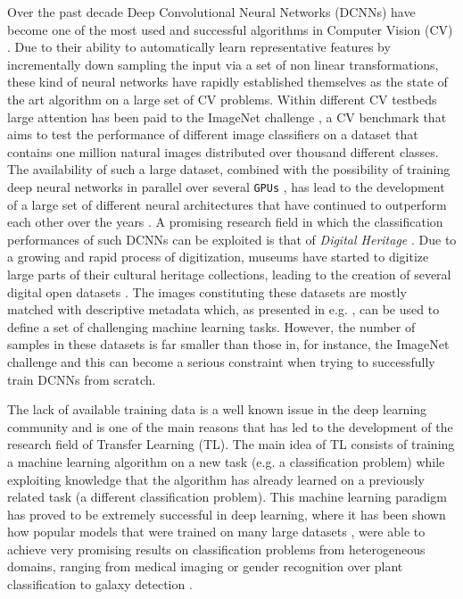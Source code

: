 Over the past decade Deep Convolutional Neural Networks (DCNNs) have become one of the most used and successful algorithms in Computer Vision (CV) \cite{donahue2014decaf, ma2015multimodal,tome2016deep}. Due to their ability to automatically learn representative features by incrementally down sampling the input via a set of non linear transformations, these kind of neural networks have rapidly established themselves as the state of the art algorithm on a large set of CV problems. Within different CV testbeds large attention has been paid to the ImageNet challenge \cite{deng2009imagenet}, a CV benchmark that aims to test the performance of different image classifiers on a dataset that contains one million natural images distributed over thousand different classes. The availability of such a large dataset, combined with the possibility of training deep neural networks in parallel over several \texttt{GPUs} \cite{krizhevsky2012imagenet}, has lead to the development of a large set of different neural architectures that have continued to outperform each other over the years \cite{simonyan2014very,szegedy2016rethinking,chollet2016xception,he2016deep,huang2017densely}.     
A promising research field in which the classification performances of such DCNNs can be exploited is that of \textit{Digital Heritage} \cite{parry2005digital}. Due to a growing and rapid process of digitization, museums have started to digitize large parts of their cultural heritage collections, leading to the creation of several digital open datasets \cite{allen2000collaboration, mensink2014rijksmuseum}. The images constituting these datasets are mostly matched with descriptive metadata  which, as presented in e.g. \cite{mensink2014rijksmuseum}, can be used to define a set of challenging machine learning tasks. However, the number of samples in these datasets is far smaller than those in, for instance, the ImageNet challenge and this can become a serious constraint when trying to successfully train DCNNs from scratch.

The lack of available training data is a well known issue in the deep learning community and is one of the main reasons that has led to the development of the research field of Transfer Learning (TL). The main idea of TL consists of training a machine learning algorithm on a new task (e.g. a classification problem) while exploiting knowledge that the algorithm has already learned on a previously related task (a different classification problem). This machine learning paradigm has proved to be extremely successful in deep learning, where it has been shown how popular models that were trained on many large datasets \cite{huang2007labeled, stallkamp2011german}, were able to achieve very promising results on classification problems from heterogeneous domains, ranging from medical imaging \cite{tajbakhsh2016convolutional} or gender recognition \cite{van2015deep} over plant classification \cite{reyes2015fine} to galaxy detection \cite{ackermann2018using}.      

